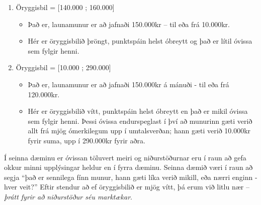 \documentclass[
]{book}
\providecommand{\tightlist}{%
  \setlength{\itemsep}{0pt}\setlength{\parskip}{0pt}}
\begin{document}
\begin{enumerate}
\def\labelenumi{\arabic{enumi}.}
\tightlist
\item
  Öryggisbil = {[}140.000 ; 160.000{]}

  \begin{itemize}
  \item
    Það er, launamunur er að jafnaði 150.000kr -- til eða frá 10.000kr.
  \item
    Hér er öryggisbilið þröngt, punktspáin helst óbreytt og það er lítil óvissa sem fylgir henni.
  \end{itemize}
\item
  Öryggisbil = {[}10.000 ; 290.000{]}

  \begin{itemize}
  \item
    Það er, launamunur er að jafnaði 150.000kr á mánuði - til eða frá 120.000kr.
  \item
    Hér er öryggisbilið vítt, punktspáin helst óbreytt en það er mikil óvissa sem fylgir henni. Þessi óvissa endurspeglast í því að munurinn gæti verið allt frá mjög ómerkilegum upp í umtalsverðan; hann gæti verið 10.000kr fyrir suma, upp í 290.000kr fyrir aðra.
  \end{itemize}
\end{enumerate}

Í seinna dæminu er óvissan töluvert meiri og niðurstöðurnar eru í raun að gefa okkur minni upplýsingar heldur en í fyrra dæminu. Seinna dæmið væri í raun að segja ``það er sennilega fínn munur, hann gæti líka verið mikill, eða nærri enginn - hver veit?'' Eftir stendur að ef öryggisbilið er mjög vítt, þá erum við litlu nær -- \emph{þrátt fyrir að niðurstöður séu marktækar}.

  
\end{document}

